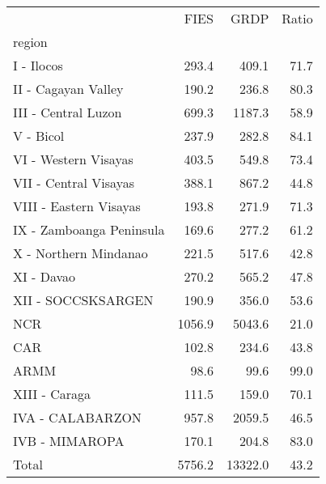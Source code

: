 \begin{tabular}{lrrr}
\toprule
{} &    FIES &     GRDP &  Ratio \\
region                   &         &          &        \\
\midrule
I - Ilocos               &   293.4 &    409.1 &   71.7 \\
II - Cagayan Valley      &   190.2 &    236.8 &   80.3 \\
III - Central Luzon      &   699.3 &   1187.3 &   58.9 \\
V - Bicol                &   237.9 &    282.8 &   84.1 \\
VI - Western Visayas     &   403.5 &    549.8 &   73.4 \\
VII - Central Visayas    &   388.1 &    867.2 &   44.8 \\
VIII - Eastern Visayas   &   193.8 &    271.9 &   71.3 \\
IX - Zamboanga Peninsula &   169.6 &    277.2 &   61.2 \\
X - Northern Mindanao    &   221.5 &    517.6 &   42.8 \\
XI - Davao               &   270.2 &    565.2 &   47.8 \\
XII - SOCCSKSARGEN       &   190.9 &    356.0 &   53.6 \\
NCR                      &  1056.9 &   5043.6 &   21.0 \\
CAR                      &   102.8 &    234.6 &   43.8 \\
ARMM                     &    98.6 &     99.6 &   99.0 \\
XIII - Caraga            &   111.5 &    159.0 &   70.1 \\
IVA - CALABARZON         &   957.8 &   2059.5 &   46.5 \\
IVB - MIMAROPA           &   170.1 &    204.8 &   83.0 \\
Total                    &  5756.2 &  13322.0 &   43.2 \\
\bottomrule
\end{tabular}
